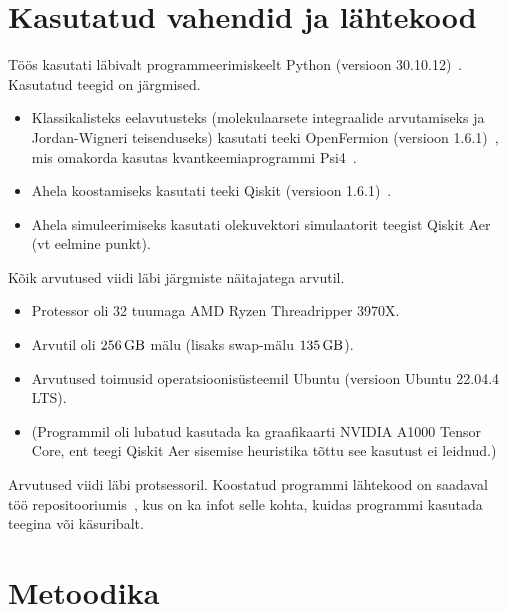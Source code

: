\documentclass[12pt]{report}
\begin{document}
\section{Kasutatud vahendid ja lähtekood}

Töös kasutati läbivalt programmeerimiskeelt Python (versioon 30.10.12)~\cite{python}.
Kasutatud teegid on järgmised.
\begin{itemize}
  \item Klassikalisteks eelavutusteks (molekulaarsete integraalide arvutamiseks ja Jordan-Wigneri teisenduseks) kasutati teeki OpenFermion (versioon 1.6.1)~\cite{openfermion}, mis omakorda kasutas kvantkeemiaprogrammi Psi4~\cite{psi4}.
  \item Ahela koostamiseks kasutati teeki Qiskit (versioon 1.6.1)~\cite{qiskit}.
  \item Ahela simuleerimiseks kasutati olekuvektori simulaatorit teegist Qiskit Aer (vt eelmine punkt).
\end{itemize}
Kõik arvutused viidi läbi järgmiste näitajatega arvutil.
\begin{itemize}
  \item Protessor oli 32 tuumaga AMD Ryzen Threadripper 3970X.
  \item Arvutil oli \(256\,{\rm GB}\) mälu (lisaks swap-mälu \(135\,{\rm GB}\)).
  \item Arvutused toimusid operatsioonisüsteemil Ubuntu (versioon Ubuntu 22.04.4 LTS).
  \item (Programmil oli lubatud kasutada ka graafikaarti NVIDIA A1000 Tensor Core, ent teegi Qiskit Aer sisemise heuristika tõttu see kasutust ei leidnud.)
\end{itemize}
Arvutused viidi läbi protsessoril.
Koostatud programmi lähtekood on saadaval töö repositooriumis~\cite{repo}, kus on ka infot selle kohta, kuidas programmi kasutada teegina või käsuribalt.

\section{Metoodika}
\end{document}
